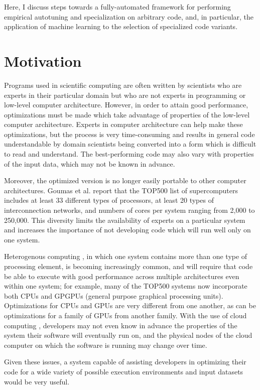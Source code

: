 \documentclass[msthesis,justified,copyright,final,numbers,sort&compress,
gsmodern,amstex,natbib]{uothesis}
\begin{document}
Here, I discuss steps towards a fully-automated framework for performing empirical autotuning and specialization on arbitrary code, and, in particular, the application of machine learning to the selection of specialized code variants.

\section{Motivation}

Programs used in scientific computing are often written by scientists who are experts in their particular domain but who are not experts in programming or low-level computer architecture. However, in order to attain good performance, optimizations must be made which take advantage of properties of the low-level computer architecture. Experts in computer architecture can help make these optimizations, but the process is very time-consuming and results in general code understandable by domain scientists being converted into a form which is difficult to read and understand. The best-performing code may also vary with properties of the input data, which may not be known in advance.

Moreover, the optimized version is no longer easily portable to other computer architectures. Goumas et al. \cite{adapt} report that the TOP500 list of supercomputers includes at least 33 different types of processors, at least 20 types of interconnection networks, and numbers of cores per system ranging from 2,000 to 250,000. This diversity limits the availability of experts on a particular system and increases the importance of not developing code which will run well only on one system.

Heterogenous computing \cite{hetero}, in which one system contains more than one type of processing element, is becoming increasingly common, and will require that code be able to execute with good performance across multiple architectures even within one system; for example, many of the TOP500 systems now incorporate both CPUs and GPGPUs (general purpose graphical processing units). Optimizations for CPUs and GPUs are very different from one another, as can be optimizations for a family of GPUs from another family. With the use of cloud computing \cite{cloud}, developers may not even know in advance the properties of the system their software will eventually run on, and the physical nodes of the cloud computer on which the software is running may change over time.

Given these issues, a system capable of assisting developers in optimizing their code for a wide variety of possible execution environments and input datasets would be very useful. 
\end{document}
